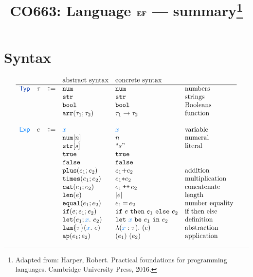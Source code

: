 \documentclass[11pt]{article}
\begin{document}
\title{CO663: Language $\textbf{EF}$ --- summary\footnote{Adapted from:
    Harper, Robert. Practical foundations for programming
    languages. Cambridge University Press, 2016.}}

\date{\vspace{-7ex}} 
\maketitle


\newcommand{\lazyeval}[1]{\framebox{\parbox[c][#1]{\textwidth}{
      \color{white}{h}%
    }}}

\section{Syntax}

\[
\begin{array}{llclll} 
  & & & \text{abstract syntax} & \text{concrete syntax}
  \\\hline
  \TYPES & \tau & \Coloneqq & \enum{}  & \enum{} & \text{numbers}
  \\
  &&& \estr{} & \estr{} & \text{strings}
  \\
  &&& \ebool{} & \ebool{} & \text{Booleans}
  \\
  &&& \tyarr{\tau_1}{\tau_2}  & \tau_1 \rightarrow \tau_2 & \text{function}
  \\ \\
  \EXPS & e & \Coloneqq  & \var{x} & \var{x} & \text{variable}
  \\
  &&& \enum{n} & n & \text{numeral}
  \\
  &&& \estr{s} & \litstr{s} & \text{literal}
  \\
  &&&  \ktrue & \ktrue 
  \\ 
  &&&  \kfalse & \kfalse 
  \\
  &&& \eplus{e_1}{e_2} & e_1 {+} e_2 & \text{addition}
  \\
  &&& \etimes{e_1}{e_2} & e_1 {*} e_2 & \text{multiplication}
  \\
  &&& \ecat{e_1}{e_2} & e_1 \concat e_2 & \text{concatenate}
  \\
  &&& \elen{e} & \lvert e \rvert & \text{length}
  \\
  &&& \eequal{e_1}{e_2} & e_1 \meq e_2 & \text{number equality}
  \\
  &&& \site{e}{e_1}{e_2} & \csite{e}{e_1}{e_2} & \text{if then else}
  \\
  &&& \elet{e_1}{x}{e_2} & \clet{e_1}{x}{e_2} & \text{definition}
  \\
  &&& \elam{\tau}{x}{e} & \clam{\tau}{x}{e} & \text{abstraction}
  \\
  &&& \eapp{e_1}{e_2} & \capp{e_1}{e_2} & \text{application}
\end{array}
\]
\end{document}
